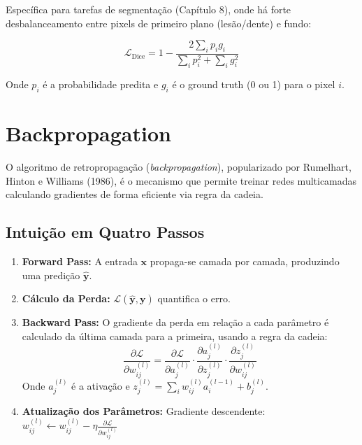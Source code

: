 Específica para tarefas de segmentação (Capítulo 8), onde há forte desbalanceamento
entre pixels de primeiro plano (lesão/dente) e fundo:

\begin{equation}
  \mathcal{L}_{\text{Dice}} = 1 - \frac{2 \sum_i p_i g_i}{\sum_i p_i^2 + \sum_i g_i^2}
  \label{eq:dice-loss}
\end{equation}

Onde $p_i$ é a probabilidade predita e $g_i$ é o ground truth (0 ou 1) para o pixel $i$.

\section{Backpropagation}
\label{sec:backpropagation}

O algoritmo de retropropagação (\textit{backpropagation}), popularizado por
Rumelhart, Hinton e Williams (1986), é o mecanismo que permite treinar redes
multicamadas calculando gradientes de forma eficiente via regra da cadeia.

\subsection{Intuição em Quatro Passos}

\begin{enumerate}
  \item \textbf{Forward Pass:} A entrada $\mathbf{x}$ propaga-se camada por camada,
        produzindo uma predição $\mathbf{\hat{y}}$.
  \item \textbf{Cálculo da Perda:} $\mathcal{L}(\mathbf{\hat{y}}, \mathbf{y})$
        quantifica o erro.
  \item \textbf{Backward Pass:} O gradiente da perda em relação a cada parâmetro é
        calculado da última camada para a primeira, usando a regra da cadeia:
        \begin{equation}
          \frac{\partial \mathcal{L}}{\partial w_{ij}^{(l)}} =
          \frac{\partial \mathcal{L}}{\partial a_j^{(l)}} \cdot
          \frac{\partial a_j^{(l)}}{\partial z_j^{(l)}} \cdot
          \frac{\partial z_j^{(l)}}{\partial w_{ij}^{(l)}}
          \label{eq:chain-rule}
        \end{equation}
        Onde $a_j^{(l)}$ é a ativação e $z_j^{(l)} = \sum_i w_{ij}^{(l)} a_i^{(l-1)} + b_j^{(l)}$.
  \item \textbf{Atualização dos Parâmetros:} Gradiente descendente:
        $w_{ij}^{(l)} \leftarrow w_{ij}^{(l)} - \eta \frac{\partial \mathcal{L}}{\partial w_{ij}^{(l)}}$
\end{enumerate}

